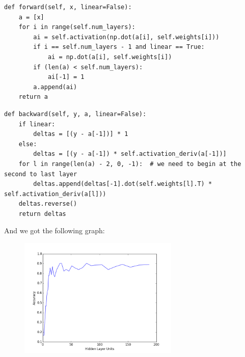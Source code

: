 \documentclass{article}
\begin{document}
\begin{lstlisting}
def forward(self, x, linear=False):
	a = [x]
	for i in range(self.num_layers):
		ai = self.activation(np.dot(a[i], self.weights[i]))
		if i == self.num_layers - 1 and linear == True:
			ai = np.dot(a[i], self.weights[i])
		if (len(a) < self.num_layers):
			ai[-1] = 1
		a.append(ai)
	return a
\end{lstlisting}
\begin{lstlisting}
def backward(self, y, a, linear=False):
	if linear:
		deltas = [(y - a[-1])] * 1
	else:
		deltas = [(y - a[-1]) * self.activation_deriv(a[-1])]
	for l in range(len(a) - 2, 0, -1):  # we need to begin at the second to last layer
		deltas.append(deltas[-1].dot(self.weights[l].T) * self.activation_deriv(a[l]))
	deltas.reverse()
	return deltas
\end{lstlisting}

And we got the following graph:
\begin{figure}[H]
\centering
\includegraphics[width=3in]{figure/figure_4_2.png}
\end{figure}



\end{document}
